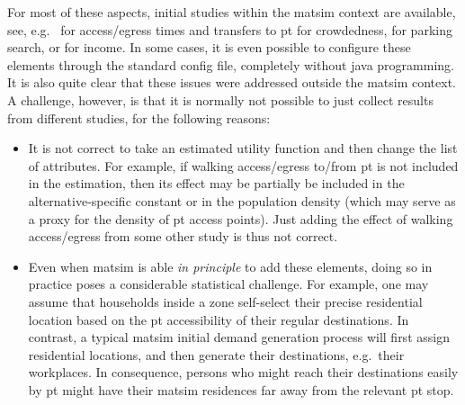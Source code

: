 For most of these aspects, initial studies within the \gls{matsim} context are available, see, e.g.\ 
%
\citet{MoyoNagelptLineCalibration,MoyoNagelptNetCalibration} for access/egress times and transfers to \acrfull{pt}
%
\citet{BoumanEtc2013Crowdedness}  for crowdedness,
%
\cite{WaraichEtAl_STRC_2013} for parking search,
%
or \cite{KickhoeferEtAl_Transportation_2011} for income.
%
In some cases, it is even possible to configure these elements through the standard config file, completely without \gls{java} programming.
%
It is also quite clear that these issues were addressed outside the \gls{matsim} context.
%
A challenge, however, is that it is normally not possible to just collect results from different studies, for the following reasons:
\begin{itemize}

\item It is not correct to take an estimated utility function and then change the list of attributes.  
%
For example, if walking access/egress to/from \gls{pt} is not included in the estimation, then its effect may be partially be included in the alternative-specific constant or in the population density (which may serve as a proxy for the density of \gls{pt} access points).  Just adding the effect of walking access/egress from some other study is thus not correct.

\item Even when \gls{matsim} is able \emph{in principle} to add these elements, doing so in practice poses a considerable statistical challenge.  For example, one may assume that households inside a zone self-select their precise residential location based on the \gls{pt} accessibility of their regular destinations.  
%
In contrast, a typical \gls{matsim} initial demand generation process will first assign residential locations, and then generate their destinations, e.g.\ their workplaces.
%
In consequence, persons who might reach their destinations easily by \gls{pt} might have their \gls{matsim} residences far away from the relevant \gls{pt} stop.

\end{itemize}

